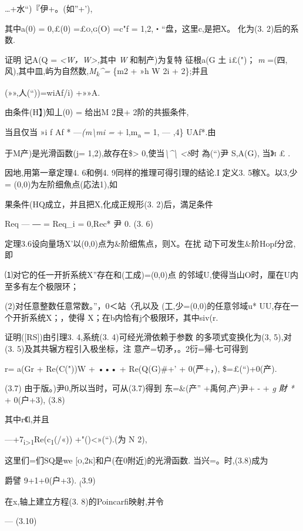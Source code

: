\documentclass{article}
\begin{document}
\ldots{}+水``)『伊+。(\textbar{}如''+'),

其中a(0) = 0,£(0) \textsc{=£o,g(O)} =c"f = 1,2,・``盘，这里c,是把X。
化为(3. 2)后的系数.

证明 记A(Q = \emph{\textless{}W，W\textgreater{},}其中 \emph{W}
和制产)为复特 征根a(G 土 i£(")； \emph{m}
=(四,风),其中皿,屿为自然数,\emph{M\textsubscript{k}\^{}=} \{m\textbar{}2
+ »h W 2i + 2\};并且

(»»,人(``))=wiAf/i) +»»A.

由条件(H】)知丄(0) = 给出M 2艮+ 2阶的共振条件,

当且仅当 »i f Af * ---\emph{(m\textbackslash{}mi =} +
l,m\textsubscript{a} = 1, --- ,4\} UAf*.由

于M产)是光滑函数(j= 1,2),故存在\$\textgreater{}
0,使当\emph{\textbackslash{}\^{}\textbackslash{} \textless{}8}时
為(``)尹 S,A(G), 当\textsc{》i £ .}

因地,用第一章定理4. 6和例4. 9同样的推理可得引理的结论.I 定义3.
5稼X。以3,少= (0,0)为左阶细魚点(応法1),如

果条件(HQ成立，并且把X,化成正规形(3. 2)后，満足条件

Req --- ― = Req\_i = 0,Rec* 尹 0. (3. 6)

定理3.6设向量场X'以(0,0)点为\&阶细焦点，则X。在扰
动下可发生\&阶Hopf分岔,即

⑴对它的任一开折系统X''存在和(工成)=(0,0)点
的邻域U,使得当山O时，厘在U内至多有左个极限环；

(2)对任意整数任意常数。''，0＜站〈孔以及 (工,少=(0,0)的任意邻域u*
UU,存在一个开折系统X；，使得 X；在b内恰有j个极限环，其中siv(r.

证明({[}RS{]})由引理3. 4,系统(3. 4)可经光滑依赖于参数
的多项式变换化为(3, 5),对(3. 5)及其共辗方程引入极坐标，注
意产=切矛，。2衍=帰-七可得到

r= a(Gr + Re(C\textbar{}("))W + ••• + Re(Q(G)\#+' + 0(严+，),
\$=£(``)+0(产).

(3.7) 由于版。)尹0,所以当时，可从(3.7)得到 东=\&(产'' +禹何,产)尹+ - +
\emph{g 財 *} + 0(户+3), (3.8)

其中r《l,并且

---+7\textsubscript{i\textgreater{}1}Re(c\textsubscript{1}(/«))
+"()\textless{}»(``).(为 N 2),

这里们=们SQ是we \textsc{{[}o,2k{]}}和户(在0附近)的光滑函数.
当兴=。时,(3.8)成为

爵譬 9+1+0(户+3). \textsubscript{(}3.9)

在x,轴上建立方程(3. 8)的Poincarfi映射,并令

--- (3.10)
\end{document}
